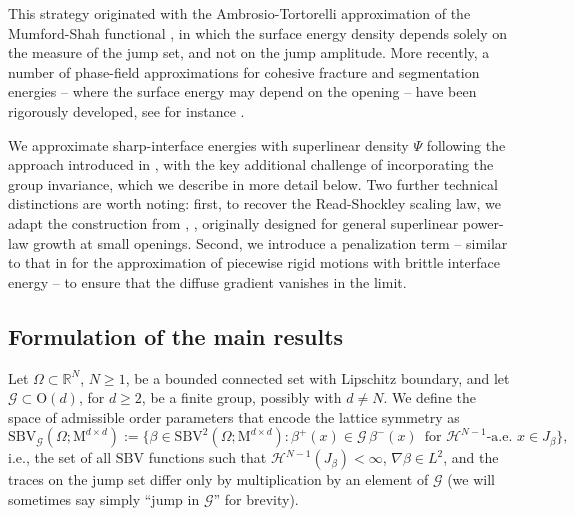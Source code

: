 \documentclass[a4paper,reqno]{amsart}
\newcommand\R{\mathbb{R}}
\newcommand{\SBV}{\mathrm{SBV}}
\newcommand{\SBVG}{\mathrm{SBV}_{\mathcal{G}}}
\newcommand\calH{\mathcal{H}}
\theoremstyle{remark}
\newcommand{\G}{\mathcal{G}}
\newcommand{\On}{\mathrm{O}(d)}
\newcommand{\Mno}{\mathrm{M}^{d\times d}}
\newcommand{\hN}{\calH^{N-1}}
\numberwithin{equation}{section}
\begin{document}
This strategy originated with the Ambrosio-Tortorelli approximation of the Mumford-Shah functional \cite{AmbTor90}, in which the surface energy density depends solely on the measure of the jump set, and not on the jump amplitude.
More recently, a number of phase-field approximations for cohesive fracture and segmentation energies -- where the surface energy may depend on the opening -- have been rigorously developed, see for instance
\cite{DMIur13, CFI14, CicFocZep21, CFI22, ConFocIur25}.

We approximate sharp-interface energies with superlinear
density $\Psi$ following the approach introduced in \cite{CFI14, ConFocIur25}, with the key additional challenge of incorporating the group invariance, which we describe in more detail below.
Two further technical distinctions are worth noting: first, to recover the Read-Shockley scaling law, we adapt the construction from \cite[Section~7]{CFI14}, \cite{ConFocIur25}, originally designed for general superlinear power-law growth at small openings. Second, we introduce a penalization term -- similar to that in
 \cite{CicFocZep21} for
the approximation of piecewise rigid motions with brittle interface energy -- to ensure that the diffuse gradient vanishes in the limit.


\subsection{Formulation of the main results}\label{sec:mainresults}
Let $\Omega\subset \R^N$, $N\geq 1$,   be a bounded connected set with Lipschitz boundary, and let $\G\subset\On$, for $d\geq2$, be a finite group, possibly with $d\ne N$.
 We define the space of admissible order parameters that encode the lattice symmetry as
 \begin{equation}\label{SBVG}
	\SBVG(\Omega;\Mno):=\{ \beta \in \mathrm{SBV}^2(\Omega; \Mno) \colon \beta^+(x) \in \G \, \beta^-(x) \, \text{ for }\hN\text{-a.e. } x \in J_\beta\},
\end{equation}
i.e., the set of all $\SBV$ 
functions such that $\calH^{N-1}(J_\beta)<\infty$, $\nabla\beta\in L^2$, and the
traces on the jump set differ only by multiplication by an element of $\G$ (we will sometimes say simply  ``jump in $\G$'' for brevity).
\end{document}

